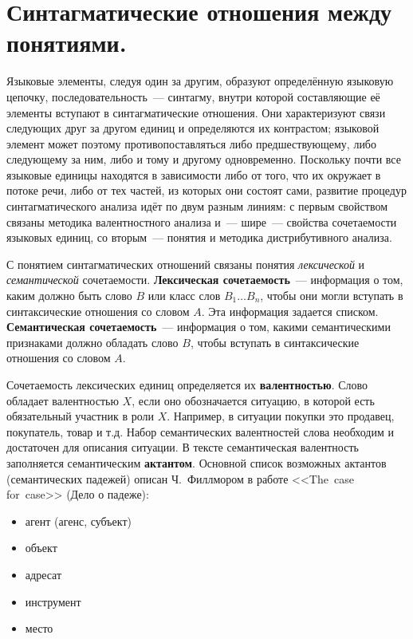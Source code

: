 \documentclass[12pt]{article}
\theoremstyle{definition}
\theoremstyle{remark}
\numberwithin{equation}{section}
\begin{document}
\section{Синтагматические отношения между понятиями.}
Языковые элементы, следуя один за другим, образуют определённую языковую цепочку, последовательность~--- синтагму, внутри которой составляющие её элементы вступают в синтагматические отношения. Они характеризуют связи следующих друг за другом единиц и определяются их контрастом; языковой элемент может поэтому противопоставляться либо предшествующему, либо следующему за ним, либо и тому и другому одновременно. Поскольку почти все языковые единицы находятся в зависимости либо от того, что их окружает в потоке речи, либо от тех частей, из которых они состоят сами, развитие процедур синтагматического анализа идёт по двум разным линиям: с первым свойством связаны методика валентностного анализа и~--- шире~--- свойства сочетаемости языковых единиц, со вторым~--- понятия и методика дистрибутивного анализа.

С понятием синтагматических отношений связаны понятия \textit{лексической} и \textit{семантической} сочетаемости. \textbf{Лексическая сочетаемость}~--- информация о том, каким должно быть слово $B$ или класс слов $B_1 \dots B_n$, чтобы они могли вступать в синтаксические отношения со словом $A$. Эта информация задается списком. \textbf{Семантическая сочетаемость}~--- информация о том, какими семантическими признаками должно обладать слово $B$, чтобы вступать в синтаксические отношения со словом $A$.

Сочетаемость лексических единиц определяется их \textbf{валентностью}. Слово обладает валентностью $X$, если оно обозначается ситуацию, в которой есть обязательный участник в роли $X$. Например, в ситуации покупки это продавец, покупатель, товар и т.д. Набор семантических валентностей слова необходим и достаточен для описания ситуации. В тексте семантическая валентность заполняется семантическим \textbf{актантом}. Основной список возможных актантов (семантических падежей) описан Ч.~Филлмором в работе <<The~case for~case>> (Дело о падеже):
\begin{itemize}
	\item агент (агенс, субъект)
	\item объект
	\item адресат
	\item инструмент
	\item место
\end{itemize}
\end{document}
